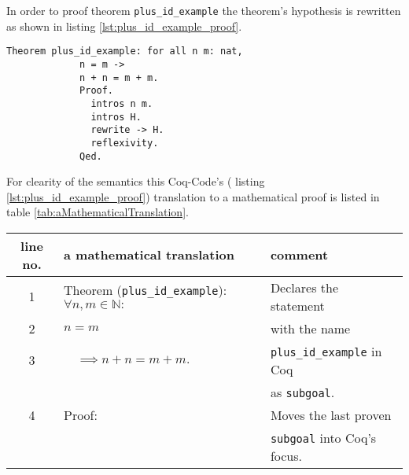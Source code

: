 	     In order to proof theorem \lstinline!plus_id_example! the theorem's hypothesis is rewritten as shown in listing \ref{lst:plus_id_example_proof}.
	     \begin{lstlisting}[caption = \lstinline!plus_id_example! and it's proof, label= {lst:plus_id_example_proof}]
           Theorem plus_id_example: for all n m: nat,
             n = m ->
             n + n = m + m.
             Proof.
               intros n m.
               intros H.
               rewrite -> H.
               reflexivity.
             Qed.
         \end{lstlisting} 
         For clearity of the semantics this Coq-Code's ( listing \ref{lst:plus_id_example_proof}) translation to a mathematical proof is listed in table \ref{tab:aMathematicalTranslation}.  
         \begin{table}[h]       
	   	  \begin{center}
	 	    \begin{tabular}{|c|l|l|}	       
	     	\hline
	     	 line no.  & a mathematical translation           & comment  \\  \hline
	     	  1        & Theorem (\verb!plus_id_example!): $\forall n,m \in \mathbb{N}:$ 
	     	                                                  & Declares the statement \\ 
	     	  2         & $n=m$                                & with the name   \\ 
	          3        & $\quad\implies n+n = m+m.$      & \lstinline!plus_id_example! in Coq \\  
		              &      & as \lstinline!subgoal!. \\  \hline
	     	  4        & Proof:                              & Moves the last proven \\   
	     	      	   &                                     & \lstinline!subgoal! into Coq's focus.  \\     \hline
	     	      	                      

\end{tabular}
\end{center}
\end{table}
